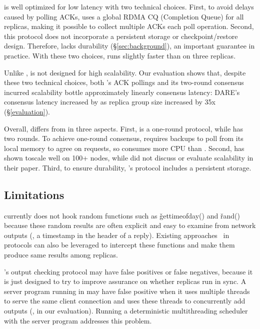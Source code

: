 \dare is well optimized for low latency with two technical choices. First, to 
avoid delays caused by polling ACKs, \dare uses a global RDMA CQ (Completion 
Queue) for all replicas, making it possible to collect multiple ACKs each poll 
operation. Second, this protocol does not incorporate a persistent storage or 
checkpoint/restore design. Therefore, \dare lacks durability 
(\S\ref{sec:background}), an important guarantee in \paxos practice. With these 
two choices, \dare runs slightly faster than \xxx on three replicas.

Unlike \xxx, \dare is not designed for high scalability. Our evaluation shows 
that, despite these two technical choices, both \dare's ACK pollings and its 
two-round consensus incurred scalability bottle approximately linearly consensus 
latency: DARE's consensus latency increased by \darescalability as replica group 
size increased by 35x (\S\ref{evaluation}).

Overall, \xxx differs from \dare in three aspects. First, \xxx is a one-round 
protocol, while \dare has two rounds. To achieve one-round consensus, \xxx 
requires backups to poll from its local memory to agree on requests, so \xxx 
consumes more CPU than \dare. Second, \xxx has shown toscale well on 100+ nodes, 
while \dare did not discuss or evaluate scalability in their paper. Third, to 
ensure durability, \xxx's protocol includes a persistent storage.

\subsection{\xxx Limitations}\label{sec:limits}


\xxx currently does not hook random functions such as \v{gettimeofday()} and 
\v{rand()} because these random results are often explicit and easy to examine 
from network outputs (\eg, a timestamp in the header of a reply). Existing 
approaches~\cite{eve:osdi12,paxos:practical} in \paxos protocols can also be 
leveraged to intercept these functions and make them produce same results among 
replicas.


\xxx's output checking protocol may have false positives or false negatives, 
because it is just designed to try to improve assurance on whether replicas run 
in sync. A server program running in \xxx may have false positive when it uses 
multiple threads to serve the same client connection and uses these threads to 
concurrently add outputs (\eg, \clamav in our evaluation). 
Running a deterministic multithreading 
scheduler~\cite{coredet:asplos10,parrot:sosp13} with the server program 
addresses this problem.

